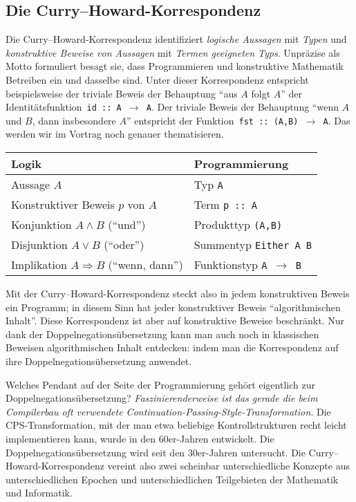 \documentclass[a4paper,ngerman,10pt]{scrartcl}
\theoremstyle{plain}
\begin{document}
\subsection*{Die Curry--Howard-Korrespondenz}

Die Curry--Howard-Korrespondenz identifiziert \emph{logische Aussagen} mit
\emph{Typen} und \emph{konstruktive Beweise von Aussagen} mit \emph{Termen geeigneten Typs}.
Unpräzise als Motto formuliert besagt sie, dass Programmieren und konstruktive
Mathematik Betreiben ein und dasselbe sind. Unter dieser Korrespondenz
entspricht beispielsweise der triviale Beweis der Behauptung "`aus $A$ folgt
$A$"' der Identitätsfunktion~\texttt{id :: A $\to$ A}. Der triviale Beweis der
Behauptung "`wenn $A$ und $B$, dann insbesondere $A$"' entspricht der
Funktion~\texttt{fst :: (A,B) $\to$ A}. Das werden wir im Vortrag noch genauer
thematisieren.

\begin{center}\begin{tabular}{ll}
  \toprule
  Logik & Programmierung \\\midrule
  Aussage $A$ & Typ \texttt{A} \\
  Konstruktiver Beweis $p$ von $A$ & Term \texttt{p :: A} \\
  Konjunktion $A \wedge B$ ("`und"') & Produkttyp \texttt{(A,B)} \\
  Disjunktion $A \vee B$ ("`oder"') & Summentyp \texttt{Either A B} \\
  Implikation $A \Rightarrow B$ ("`wenn, dann"') & Funktionstyp \texttt{A $\to$ B} \\
  \bottomrule
\end{tabular}\end{center}

Mit der Curry--Howard-Korrespondenz steckt also in jedem konstruktiven Beweis
ein Programm; in diesem Sinn hat jeder konstruktiver Beweis "`algorithmischen
Inhalt"'. Diese Korrespondenz ist aber auf konstruktive Beweise beschränkt. Nur
dank der Doppelnegationsübersetzung kann man auch noch in klassischen Beweisen
algorithmischen Inhalt entdecken: indem man die Korrespondenz auf ihre
Doppelnegationsübersetzung anwendet.

Welches Pendant auf der Seite der Programmierung gehört eigentlich zur
Dop\-pel\-ne\-ga\-tions\-über\-set\-zung? \emph{Faszinierenderweise ist das gerade die beim
Compilerbau oft verwendete Continuation-Passing-Style-Transformation.} Die
CPS-Transformation, mit der man etwa beliebige Kontrollstrukturen recht leicht
implementieren kann, wurde in den 60er-Jahren entwickelt. Die
Doppelnegationsübersetzung wird seit den 30er-Jahren untersucht. Die
Curry--Howard-Korrespondenz vereint also zwei scheinbar unterschiedliche
Konzepte aus unterschiedlichen Epochen und unterschiedlichen Teilgebieten der
Mathematik und Informatik.
\end{document}
